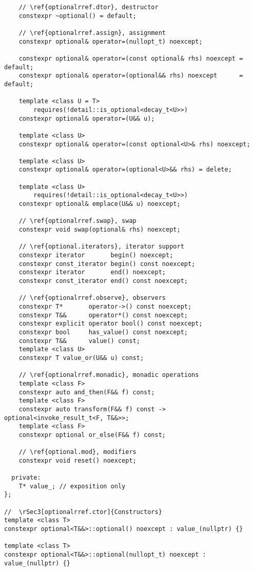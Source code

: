 \documentclass[a4paper,10pt,oneside,openany,final,article]{memoir}
\begin{document}
\begin{verbatim}
    // \ref{optionalrref.dtor}, destructor
    constexpr ~optional() = default;

    // \ref{optionalrref.assign}, assignment
    constexpr optional& operator=(nullopt_t) noexcept;

    constexpr optional& operator=(const optional& rhs) noexcept = default;
    constexpr optional& operator=(optional&& rhs) noexcept      = default;

    template <class U = T>
        requires(!detail::is_optional<decay_t<U>>)
    constexpr optional& operator=(U&& u);

    template <class U>
    constexpr optional& operator=(const optional<U>& rhs) noexcept;

    template <class U>
    constexpr optional& operator=(optional<U>&& rhs) = delete;

    template <class U>
        requires(!detail::is_optional<decay_t<U>>)
    constexpr optional& emplace(U&& u) noexcept;

    // \ref{optionalrref.swap}, swap
    constexpr void swap(optional& rhs) noexcept;

    // \ref{optional.iterators}, iterator support
    constexpr iterator       begin() noexcept;
    constexpr const_iterator begin() const noexcept;
    constexpr iterator       end() noexcept;
    constexpr const_iterator end() const noexcept;

    // \ref{optionalrref.observe}, observers
    constexpr T*       operator->() const noexcept;
    constexpr T&&      operator*() const noexcept;
    constexpr explicit operator bool() const noexcept;
    constexpr bool     has_value() const noexcept;
    constexpr T&&      value() const;
    template <class U>
    constexpr T value_or(U&& u) const;

    // \ref{optionalrref.monadic}, monadic operations
    template <class F>
    constexpr auto and_then(F&& f) const;
    template <class F>
    constexpr auto transform(F&& f) const -> optional<invoke_result_t<F, T&&>>;
    template <class F>
    constexpr optional or_else(F&& f) const;

    // \ref{optional.mod}, modifiers
    constexpr void reset() noexcept;

  private:
    T* value_; // exposition only
};

//  \rSec3[optionalrref.ctor]{Constructors}
template <class T>
constexpr optional<T&&>::optional() noexcept : value_(nullptr) {}

template <class T>
constexpr optional<T&&>::optional(nullopt_t) noexcept : value_(nullptr) {}


\end{verbatim}
\end{document}
